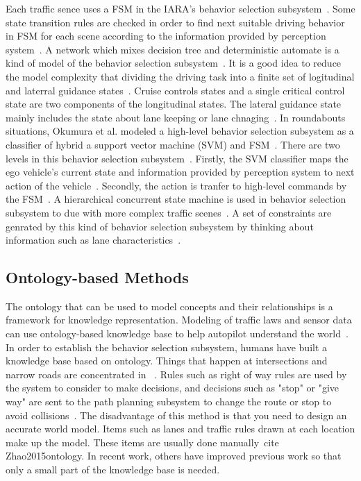 \documentclass[conference]{IEEEtran}
\begin{document}
Each traffic sence uses a FSM in the IARA's behavior selection subsystem~\cite{guidolini2018handling}. Some state transition rules are checked in order to find next suitable driving behavior in FSM for each scene according to the information provided by perception system~\cite{guidolini2018handling}. A network which mixes decision tree and deterministic automate is a kind of model of the behavior selection subsystem~\cite{Aeberhard2015}. It is a good idea to reduce the model complexity that dividing the driving task into a finite set of logitudinal and laterral guidance states~\cite{Aeberhard2015}. Cruise controls states and a single critical control state are two components of the longitudinal states. The lateral guidance state mainly includes the state about lane keeping or lane chnaging~\cite{Aeberhard2015}. In roundabouts situations, Okumura et al. modeled a high-level behavior selection subsystem as a classifier of hybrid a support vector machine (SVM) and FSM~\cite{Okumura2016}. There are two levels in this behavior selection subsystem~\cite{Okumura2016}. Firstly, the SVM classifier maps the ego vehicle's current state and information provided by perception system to next action of the vehicle~\cite{Okumura2016}. Secondly, the action is tranfer to high-level commands by the FSM~\cite{Okumura2016}. A hierarchical concurrent state machine is used in behavior selection subsystem to due with more complex traffic scenes~\cite{Ziegler2014}. A set of constraints are genrated by this kind of behavior selection subsystem by thinking about information such as lane characteristics~\cite{Ziegler2014}. 

\subsection{Ontology-based Methods}
The ontology that can be used to model concepts and their relationships is a framework for knowledge representation. Modeling of traffic laws and sensor data can use ontology-based knowledge base to help autopilot understand the world~\cite {Zhao2015ontology}. In order to establish the behavior selection subsystem, humans have built a knowledge base based on ontology. Things that happen at intersections and narrow roads are concentrated in ~\cite {Zhao2015ontology}. Rules such as right of way rules are used by the system to consider to make decisions, and decisions such as "stop" or "give way" are sent to the path planning subsystem to change the route or stop to avoid collisions~\cite{Zhao2015ontology}. The disadvantage of this method is that you need to design an accurate world model. Items such as lanes and traffic rules drawn at each location make up the model. These items are usually done manually\ cite {Zhao2015ontology}. In recent work, others have improved previous work so that only a small part of the knowledge base is needed\cite {Zhao20171425}.
\end{document}

